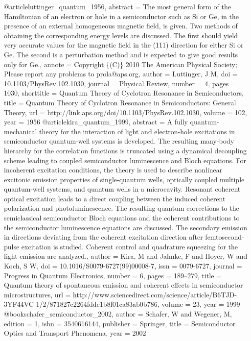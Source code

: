 @article{luttinger_quantum_1956,
abstract = {The most general form of the Hamiltonian of an electron or hole in a semiconductor such as Si or Ge, in the presence of an external homogeneous magnetic field, is given. Two methods of obtaining the corresponding energy levels are discussed. The first should yield very accurate values for the magnetic field in the (111) direction for either Si or Ge. The second is a perturbation method and is expected to give good results only for Ge.},
annote = {Copyright \{(C)\} 2010 The American Physical Society; Please report any problems to prola@aps.org},
author = {Luttinger, J M},
doi = {10.1103/PhysRev.102.1030},
journal = {Physical Review},
number = {4},
pages = {1030},
shorttitle = {Quantum Theory of Cyclotron Resonance in Semiconductors},
title = {{Quantum Theory of Cyclotron Resonance in Semiconductors: General Theory}},
url = {http://link.aps.org/doi/10.1103/PhysRev.102.1030},
volume = {102},
year = {1956}
}
@article{kira_quantum_1999,
abstract = {A fully quantum-mechanical theory for the interaction of light and electron-hole excitations in semiconductor quantum-well systems is developed. The resulting many-body hierarchy for the correlation functions is truncated using a dynamical decoupling scheme leading to coupled semiconductor luminescence and Bloch equations. For incoherent excitation conditions, the theory is used to describe nonlinear excitonic emission properties of single-quantum wells, optically coupled multiple quantum-well systems, and quantum wells in a microcavity. Resonant coherent optical excitation leads to a direct coupling between the induced coherent polarization and photoluminescence. The resulting quantum corrections to the semiclassical semiconductor Bloch equations and the coherent contributions to the semiconductor luminescence equations are discussed. The secondary emission in directions deviating from the coherent excitation direction after femtosecond-pulse excitation is studied. Coherent control and quadrature squeezing for the light emission are analyzed.},
author = {Kira, M and Jahnke, F and Hoyer, W and Koch, S W},
doi = {10.1016/S0079-6727(99)00008-7},
issn = {0079-6727},
journal = {Progress in Quantum Electronics},
number = {6},
pages = {189--279},
title = {{Quantum theory of spontaneous emission and coherent effects in semiconductor microstructures}},
url = {http://www.sciencedirect.com/science/article/B6TJD-3YF44VC-1/2/871827e2264fddc1b8f01ca83ab0b786},
volume = {23},
year = {1999}
}
@book{schafer_semiconductor_2002,
author = {Schafer, W and Wegener, M},
edition = {1},
isbn = {3540616144},
publisher = {Springer},
title = {{Semiconductor Optics and Transport Phenomena}},
year = {2002}
}
